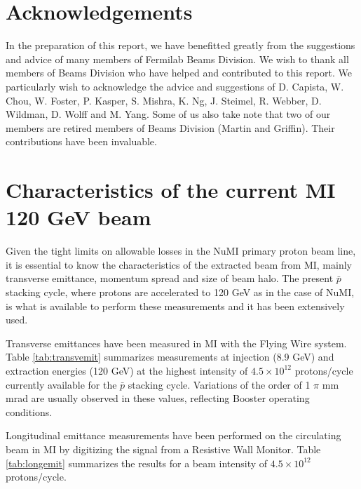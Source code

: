 \documentclass{article}
\begin{document}


\section {Acknowledgements}

In the preparation of this report, we have benefitted greatly from the 
suggestions and advice of many members of Fermilab Beams Division. We wish to
thank all members of Beams Division who have helped and contributed to this
report. We particularly wish to acknowledge the advice and suggestions of
D. Capista, W. Chou, W. Foster, P. Kasper, S. Mishra, K. Ng, 
J. Steimel, R. Webber, D. Wildman, D. Wolff and M. Yang. 
Some of us also take note
that two of our members are retired members of Beams Division (Martin and
Griffin). Their contributions have been invaluable.

\newpage
\appendix 
\section {Characteristics of the current MI 120 GeV beam}

Given the tight limits on allowable losses in the NuMI primary proton 
beam line, it is essential to know the characteristics of the extracted
beam from MI, mainly transverse emittance, momentum spread 
and size of beam halo. The present $\bar p$ stacking cycle, where protons
are accelerated to 120 GeV as in the case of NuMI, is what is available 
to perform these measurements and it has been extensively used.

Transverse emittances have been measured in MI with the Flying Wire system.  
Table \ref {tab:transvemit} summarizes measurements at injection (8.9 GeV) 
and extraction energies (120 GeV) at the highest intensity of 
$4.5 \times 10^{12}$ protons/cycle currently available for the
$\bar p$ stacking cycle.
Variations of the order of 1 $\pi$ mm mrad are usually observed in these 
values, reflecting Booster operating conditions.

Longitudinal emittance measurements have been performed on the circulating 
beam in MI by digitizing the signal from a Resistive Wall Monitor. 
Table \ref {tab:longemit} summarizes the results for a beam intensity of 
$4.5 \times 10^{12}$ protons/cycle. 
\end{document}
